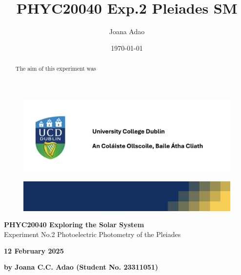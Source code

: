 \documentclass[12pt]{article}
\title{PHYC20040 Exp.2 Pleiades SM}
\author{Joana Adao}
\date{\today}
\begin{document}
\begin{titlepage}
    \begin{center}

        \begin{figure}[ht]
            \includegraphics[width=\textwidth]{UCDLogo.png}
        \end{figure}
        
        \begin{figure}
            \centerline{\includegraphics[width=\paperwidth]{UCDBanner.png}}
        \end{figure}

        \vspace{4cm}

        {\LARGE \bfseries PHYC20040 Exploring the Solar System}\\
        \vspace{0.75cm}
        {\Large Experiment No.2 Photoelectric Photometry of the Pleiades}
        
        \vspace{1cm}
    
    {\Large \textbf{12 February 2025}}

    \vspace{2cm}
    
    {\large \textbf{by Joana C.C. Adao (Student No. 23311051)}}\\

    \end{center}
    
   \clearpage

\end{titlepage}

\setcounter{page}{1}
\tableofcontents

\newpage

\begin{abstract}

The aim of this experiment was 

\end{abstract}
\end{document}
